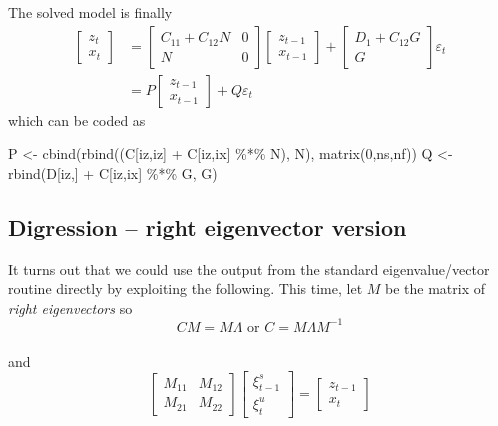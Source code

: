 \documentclass[
  letterpaper,
]{book}
\newenvironment{Shaded}{\begin{snugshade}}{\end{snugshade}}
\newcommand{\DecValTok}[1]{\textcolor[rgb]{0.68,0.00,0.00}{#1}}
\newcommand{\FunctionTok}[1]{\textcolor[rgb]{0.28,0.35,0.67}{#1}}
\newcommand{\NormalTok}[1]{\textcolor[rgb]{0.00,0.23,0.31}{#1}}
\newcommand{\OtherTok}[1]{\textcolor[rgb]{0.00,0.23,0.31}{#1}}
\newcommand{\SpecialCharTok}[1]{\textcolor[rgb]{0.37,0.37,0.37}{#1}}
\begin{document}
The solved model is finally \begin{align}
\begin{bmatrix} z_t \\ x_t \end{bmatrix} &= \begin{bmatrix} C_{11}+C_{12}N & 0 \\ N & 0 \end{bmatrix} \begin{bmatrix} z_{t-1} \\ x_{t-1} \end{bmatrix} + \begin{bmatrix} D_1+C_{12}G \\ G \end{bmatrix} \varepsilon_t \\
 &= P \begin{bmatrix} z_{t-1} \\ x_{t-1} \end{bmatrix} + Q \varepsilon_t
\end{align} which can be coded as

\begin{Shaded}
\begin{Highlighting}[]
\NormalTok{P  }\OtherTok{\textless{}{-}} \FunctionTok{cbind}\NormalTok{(}\FunctionTok{rbind}\NormalTok{((C[iz,iz] }\SpecialCharTok{+}\NormalTok{ C[iz,ix] }\SpecialCharTok{\%*\%}\NormalTok{ N), N), }\FunctionTok{matrix}\NormalTok{(}\DecValTok{0}\NormalTok{,ns,nf))}
\NormalTok{Q  }\OtherTok{\textless{}{-}} \FunctionTok{rbind}\NormalTok{(D[iz,] }\SpecialCharTok{+}\NormalTok{ C[iz,ix] }\SpecialCharTok{\%*\%}\NormalTok{ G, G)}
\end{Highlighting}
\end{Shaded}

\hypertarget{digression-right-eigenvector-version}{%
\subsection{Digression -- right eigenvector
version}\label{digression-right-eigenvector-version}}

It turns out that we could use the output from the standard
eigenvalue/vector routine directly by exploiting the following. This
time, let \(M\) be the matrix of \emph{right eigenvectors} so \[
  C M = M \Lambda \text{  or  } C = M\Lambda M^{-1}
\]\\
and \[
\begin{bmatrix} M_{11} & M_{12} \\ M_{21} & M_{22} \end{bmatrix}
\begin{bmatrix} \xi_{t-1}^s \\ \xi_t^u \end{bmatrix}
 = 
\begin{bmatrix} z_{t-1} \\ x_t \end{bmatrix}
\]
\end{document}
